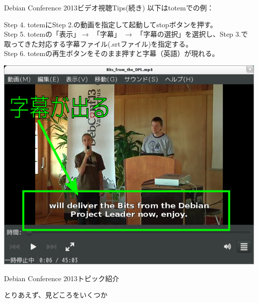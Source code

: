 \begin{frame}[containsverbatim]{Debian Conference 2013ビデオ視聴Tips(続き)}
以下はtotemでの例：

Step 4. totemにStep 2.の動画を指定して起動してstopボタンを押す。\\

Step 5. totemの「表示」$\rightarrow$ 「字幕」 $\rightarrow$ 「字幕の選択」を選択し、Step 3.で取ってきた対応する字幕ファイル(.srtファイル)を指定する。\\

Step 6. totemの再生ボタンをそのまま押すと字幕（英語）が現れる。
\begin{center}
\includegraphics[scale=0.25]{image201310/totem-subtitle.png}
\end{center}

\end{frame}

\begin{frame}{Debian Conference 2013トピック紹介}
\begin{center}
\LARGE
とりあえず、見どころをいくつか
\end{center}
\end{frame}

